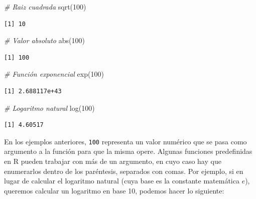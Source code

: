 \documentclass[
]{book}
\newenvironment{Shaded}{\begin{snugshade}}{\end{snugshade}}
\newcommand{\CommentTok}[1]{\textcolor[rgb]{0.56,0.35,0.01}{\textit{#1}}}
\newcommand{\DecValTok}[1]{\textcolor[rgb]{0.00,0.00,0.81}{#1}}
\newcommand{\FunctionTok}[1]{\textcolor[rgb]{0.00,0.00,0.00}{#1}}
\newcommand{\NormalTok}[1]{#1}
\begin{document}
\begin{Shaded}
\begin{Highlighting}[]
\CommentTok{\# Raiz cuadrada}
\FunctionTok{sqrt}\NormalTok{(}\DecValTok{100}\NormalTok{)}
\end{Highlighting}
\end{Shaded}

\begin{verbatim}
[1] 10
\end{verbatim}

\begin{Shaded}
\begin{Highlighting}[]
\CommentTok{\# Valor absoluto}
\FunctionTok{abs}\NormalTok{(}\DecValTok{100}\NormalTok{)}
\end{Highlighting}
\end{Shaded}

\begin{verbatim}
[1] 100
\end{verbatim}

\begin{Shaded}
\begin{Highlighting}[]
\CommentTok{\# Función exponencial}
\FunctionTok{exp}\NormalTok{(}\DecValTok{100}\NormalTok{)}
\end{Highlighting}
\end{Shaded}

\begin{verbatim}
[1] 2.688117e+43
\end{verbatim}

\begin{Shaded}
\begin{Highlighting}[]
\CommentTok{\# Logaritmo natural}
\FunctionTok{log}\NormalTok{(}\DecValTok{100}\NormalTok{)}
\end{Highlighting}
\end{Shaded}

\begin{verbatim}
[1] 4.60517
\end{verbatim}

En los ejemplos anteriores, \texttt{100} representa un valor numérico que se pasa como argumento a la función para que la misma opere. Algunas funciones predefinidas en R pueden trabajar con más de un argumento, en cuyo caso hay que enumerarlos dentro de los paréntesis, separados con comas. Por ejemplo, si en lugar de calcular el logaritmo natural (cuya base es la constante matemática \(e\)), queremos calcular un logaritmo en base 10, podemos hacer lo siguiente:
\end{document}
